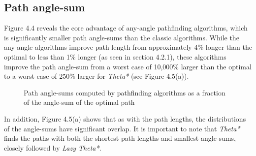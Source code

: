 \documentclass[12pt,notitlepage]{report}
\begin{document}
\subsection{Path angle-sum}

Figure 4.4 reveals the core advantage of any-angle pathfinding algorithms, which is significantly smaller path angle-sums than the classic algorithms. While the any-angle algorithms improve path length from approximately 4\% longer than the optimal to less than 1\% longer (as seen in section 4.2.1), these algorithms improve the path angle-sum from a worst case of 10,000\% larger than the optimal to a worst case of 250\% larger for {\em Theta*} (see Figure 4.5(a)).\\

\begin{figure}
\centering

\caption[Path angle-sums computed by pathfinding algorithms]{Path angle-sums computed by pathfinding algorithms as a fraction of the angle-sum of the optimal path}
\end{figure}

\noindent
In addition, Figure 4.5(a) shows that as with the path lengths, the distributions of the angle-sums have significant overlap. It is important to note that {\em Theta*} finds the paths with both the shortest path lengths and smallest angle-sums, closely followed by {\em Lazy Theta*}.\\
\end{document}
